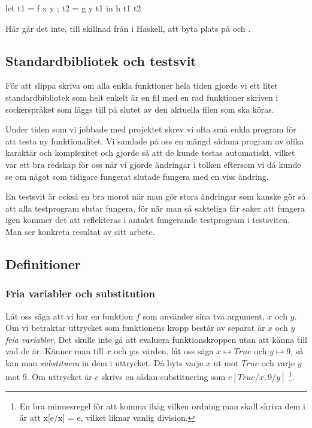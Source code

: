 \documentclass[Rapport]{subfiles}
\begin{document}
\begin{codeEx}
let { t1 = f x y
    ; t2 = g y t1
    }
in  h t1 t2
\end{codeEx}

Här går det inte, till skillnad från i Haskell, att byta plats på  och .

\subsection{Standardbibliotek och testsvit}

För att slippa skriva om alla enkla funktioner hela tiden gjorde vi ett litet standardbibliotek
som helt enkelt är en fil med en rad funktioner skriven i sockerspråket som läggs
till på slutet av den aktuella filen som ska köras.

Under tiden som vi jobbade med projektet skrev vi ofta små enkla
program för att testa ny funktionalitet. Vi samlade på oss en mängd sådana program av
olika karaktär och komplexitet och gjorde så att de kunde testas automatiskt, 
vilket var ett bra redskap för oss 
när vi gjorde ändringar i tolken eftersom vi då kunde se om något som tidigare
fungerat slutade fungera med en viss ändring. 

En testsvit är också en bra morot när man gör stora ändringar som kanske gör så att
alla testprogram slutar fungera, för när man så sakteliga får saker att fungera
igen kommer det att reflekteras i antalet fungerande testprogram i testsviten. 
Man ser konkreta resultat av sitt arbete.



\subsection{Definitioner}

\subsubsection{Fria variabler och substitution}
Låt oss säga att vi har en funktion $f$ som använder sina två 
argument, $x$ och $y$. Om vi betraktar uttrycket som funktionens 
kropp består av separat är $x$ och $y$ 
\emph{fria variabler}. Det skulle inte gå att evaluera funktionskroppen utan
att känna till vad de är. Känner man till $x$ och $y$:s värden, låt oss säga
$x \mapsto True$ och $y \mapsto 9$, så kan man \emph{substituera} in dem i uttrycket. Då byts varje
$x$ ut mot $True$ och varje $y$ mot $9$. Om uttrycket är $e$ skrivs en sådan substituering som $e[True/x, 9/y]$
\footnote{En bra minnesregel för att komma ihåg vilken ordning man skall skriva dem i är att x[e/x] = e, vilket liknar vanlig division.}. 
\end{document}
